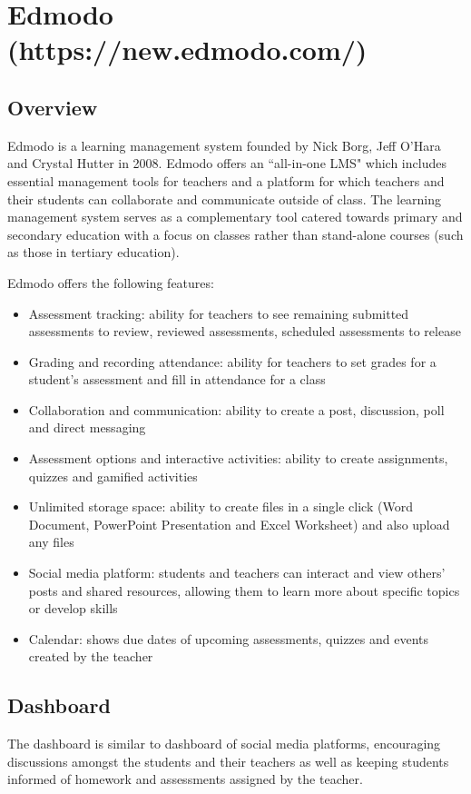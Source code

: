 \section{Edmodo (https://new.edmodo.com/)}
\subsection{Overview}
Edmodo is a learning management system founded by Nick Borg, Jeff O'Hara and Crystal Hutter in 2008. Edmodo offers an ``all-in-one LMS" which includes essential management tools for teachers and a platform for which teachers and their students can collaborate and communicate outside of class. The learning management system serves as a complementary tool catered towards primary and secondary education with a focus on classes rather than stand-alone courses (such as those in tertiary education)\cite{edmodoAbout}. 

Edmodo offers the following features\cite{edmodoLMS}:
\begin{itemize}
    \item Assessment tracking: ability for teachers to see remaining submitted assessments to review, reviewed assessments, scheduled assessments to release
    \item Grading and recording attendance: ability for teachers to set grades for a student's assessment and fill in attendance for a class
    \item Collaboration and communication: ability to create a post, discussion, poll and direct messaging
    \item Assessment options and interactive activities: ability to create assignments, quizzes and gamified activities\cite{edmodoGamification}
    \item Unlimited storage space: ability to create files in a single click (Word Document, PowerPoint Presentation and Excel Worksheet) and also upload any files
    \item Social media platform: students and teachers can interact and view others' posts and shared resources, allowing them to learn more about specific topics or develop skills
    \item Calendar: shows due dates of upcoming assessments, quizzes and events created by the teacher
\end{itemize}

\subsection{Dashboard}
The dashboard is similar to dashboard of social media platforms, encouraging discussions amongst the students and their teachers as well as keeping students informed of homework and assessments assigned by the teacher.

